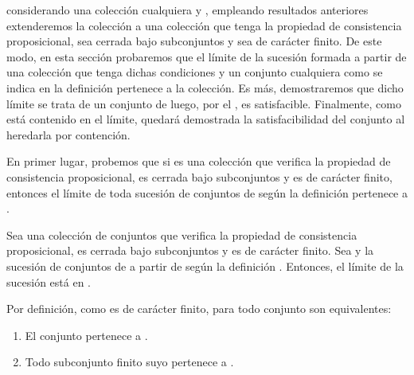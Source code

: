 \begin{isabellebody}
\begin{isamarkuptext}
  considerando una colección  cualquiera y , empleando resultados anteriores extenderemos 
  la colección a una colección  que tenga la propiedad de consistencia proposicional, sea
  cerrada bajo subconjuntos y sea de carácter finito. De este modo, en esta sección probaremos que el 
  límite de la sucesión formada a partir de una colección que tenga dichas condiciones y un conjunto
  cualquiera  como se indica en la definición  pertenece a la colección. Es más, 
  demostraremos que dicho límite se trata de un conjunto de  luego, por el , es satisfacible. Finalmente, como  está contenido en el límite, quedará demostrada 
  la satisfacibilidad del conjunto  al heredarla por contención.

\end{isamarkuptext}\isamarkuptrue%
%
\begin{isamarkuptext}%
En primer lugar, probemos que si  es una colección que verifica la propiedad de 
  consistencia proposicional, es cerrada bajo subconjuntos y es de carácter finito, entonces el 
  límite de toda sucesión de conjuntos de  según la definición  pertenece a .

  \begin{lema}
    Sea  una colección de conjuntos que verifica la propiedad de consistencia proposicional, es 
    cerrada bajo subconjuntos y es de carácter finito. Sea  y  la sucesión de conjuntos
    de  a partir de  según la definición . Entonces, el límite de la sucesión está en
    .
  \end{lema}

  \begin{demostracion}
    Por definición, como  es de carácter finito, para todo conjunto son equivalentes:
    \begin{enumerate}
      \item El conjunto pertenece a .
      \item Todo subconjunto finito suyo pertenece a .
    \end{enumerate}


\end{demostracion}
\end{isamarkuptext}
\end{isabellebody}
